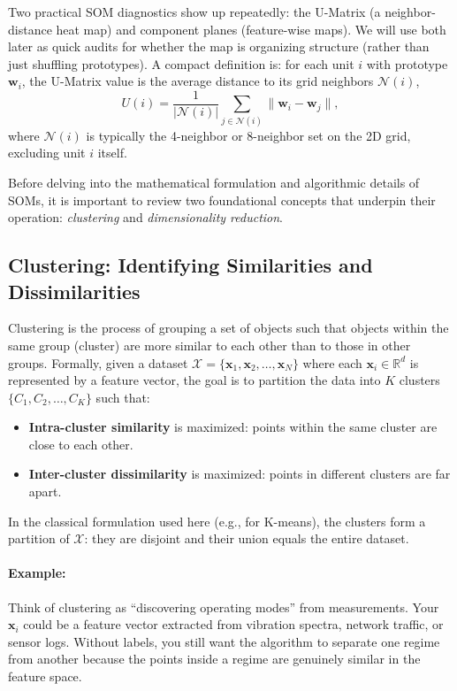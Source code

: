 Two practical SOM diagnostics show up repeatedly: the U-Matrix (a neighbor-distance heat map) and component planes (feature-wise maps). We will use both later as quick audits for whether the map is organizing structure (rather than just shuffling prototypes). A compact definition is: for each unit \(i\) with prototype \(\mathbf{w}_i\), the U\hyp{}Matrix value is the average distance to its grid neighbors \(\mathcal{N}(i)\),
\[
U(i)=\frac{1}{|\mathcal{N}(i)|}\sum_{j\in\mathcal{N}(i)}\|\mathbf{w}_i-\mathbf{w}_j\|,
\]
where \(\mathcal{N}(i)\) is typically the 4\hyp{}neighbor or 8\hyp{}neighbor set on the 2D grid, excluding unit \(i\) itself.

Before delving into the mathematical formulation and algorithmic details of SOMs, it is important to review two foundational concepts that underpin their operation: \emph{clustering} and \emph{dimensionality reduction}.

\subsection{Clustering: Identifying Similarities and Dissimilarities}
\label{sec:som_clustering_identifying_similarities_and_dissimilarities}

Clustering is the process of grouping a set of objects such that objects within the same group (cluster) are more similar to each other than to those in other groups. Formally, given a dataset $\mathcal{X} = \{\mathbf{x}_1, \mathbf{x}_2, \ldots, \mathbf{x}_N\}$ where each $\mathbf{x}_i \in \mathbb{R}^d$ is represented by a feature vector, the goal is to partition the data into $K$ clusters $\{C_1, C_2, \ldots, C_K\}$ such that:
\begin{itemize}
    \item \textbf{Intra-cluster similarity} is maximized: points within the same cluster are close to each other.
    \item \textbf{Inter-cluster dissimilarity} is maximized: points in different clusters are far apart.
\end{itemize}
In the classical formulation used here (e.g., for K-means), the clusters form a partition of $\mathcal{X}$: they are disjoint and their union equals the entire dataset.

\paragraph{Example:} Think of clustering as ``discovering operating modes'' from measurements. Your \(\mathbf{x}_i\) could be a feature vector extracted from vibration spectra, network traffic, or sensor logs. Without labels, you still want the algorithm to separate one regime from another because the points inside a regime are genuinely similar in the feature space.

